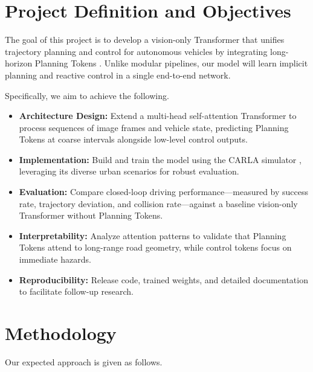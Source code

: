 \documentclass[11pt,a4paper]{article}
\begin{document}
\section*{Project Definition and Objectives}
The goal of this project is to develop a vision-only Transformer that unifies trajectory planning and control for autonomous vehicles by integrating long-horizon Planning Tokens \cite{clinton2024planningtransformerlonghorizonoffline}. Unlike modular pipelines, our model will learn implicit planning and reactive control in a single end-to-end network.

Specifically, we aim to achieve the following.
\begin{itemize}
    \item \textbf{Architecture Design:} Extend a multi-head self-attention Transformer to process sequences of image frames and vehicle state, predicting Planning Tokens at coarse intervals alongside low-level control outputs.
    \item \textbf{Implementation:} Build and train the model using the CARLA simulator \cite{DBLP:journals/corr/abs-1711-03938}, leveraging its diverse urban scenarios for robust evaluation.
    \item \textbf{Evaluation:} Compare closed-loop driving performance—measured by success rate, trajectory deviation, and collision rate—against a baseline vision-only Transformer without Planning Tokens.
    \item \textbf{Interpretability:} Analyze attention patterns to validate that Planning Tokens attend to long-range road geometry, while control tokens focus on immediate hazards.
    \item \textbf{Reproducibility:} Release code, trained weights, and detailed documentation to facilitate follow-up research.
\end{itemize}

\section*{Methodology}
Our expected approach is given as follows.
\end{document}
